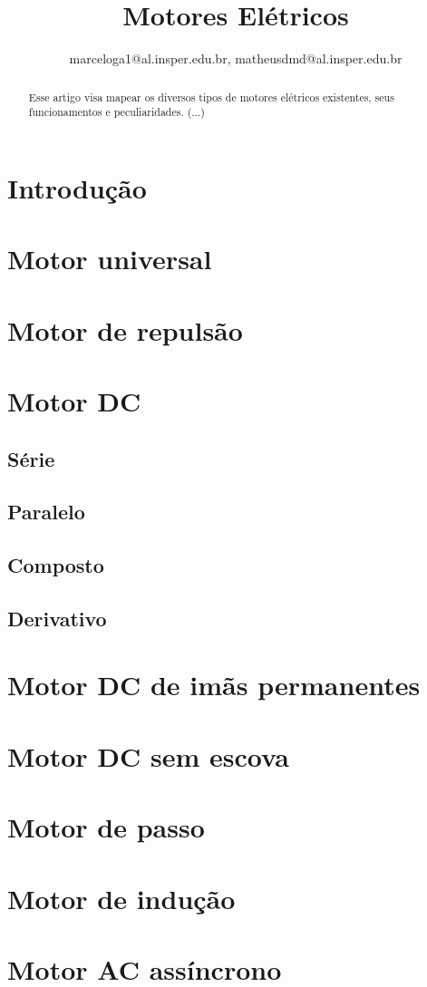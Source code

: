 \documentclass[conference]{IEEEtran}
\begin{document}
	
\title{Motores Elétricos}
\author{
 marceloga1@al.insper.edu.br, matheusdmd@al.insper.edu.br}

\maketitle

\begin{abstract}
Esse artigo visa mapear os diversos tipos de motores elétricos existentes, seus funcionamentos e peculiaridades. (...)
\end{abstract}


\section{Introdução}

\section{Motor universal}
\section{Motor de repulsão}

\section{Motor DC}
\subsection{Série}
\subsection{Paralelo}
\subsection{Composto}
\subsection{Derivativo}
\section{Motor DC de imãs permanentes}
\section{Motor DC sem escova}
\section{Motor de passo}
\section{Motor de indução}
\section{Motor AC assíncrono}


\section{}
\end{document}

